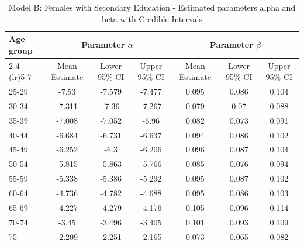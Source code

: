 \begin{landscape}
\begin{table}[htbp]
\centering
\caption{Model B: Females with Secondary Education - Estimated parameters alpha and beta  with Credible Intervals}
\label{tab:parameters_ab11}
\begin{tabular}{@{}lcccccc@{}}
\toprule
Age group & \multicolumn{3}{c}{Parameter \(\alpha\)} & \multicolumn{3}{c}{Parameter \(\beta\)} \\ 
\cmidrule(lr){2-4} \cmidrule(lr){5-7}
          & Mean Estimate & Lower 95\% CI & Upper 95\% CI & Mean Estimate & Lower 95\% CI & Upper 95\% CI \\ 
\midrule
25-29 & -7.53 & -7.579 & -7.477 & 0.095 & 0.086 & 0.104 \\
30-34 & -7.311 & -7.36 & -7.267 & 0.079 & 0.07 & 0.088 \\
35-39 & -7.008 & -7.052 & -6.96 & 0.082 & 0.073 & 0.091 \\
40-44 & -6.684 & -6.731 & -6.637 & 0.094 & 0.086 & 0.102 \\
45-49 & -6.252 & -6.3 & -6.206 & 0.096 & 0.087 & 0.104 \\
50-54 & -5.815 & -5.863 & -5.766 & 0.085 & 0.076 & 0.094 \\
55-59 & -5.338 & -5.386 & -5.292 & 0.095 & 0.087 & 0.102 \\
60-64 & -4.736 & -4.782 & -4.688 & 0.095 & 0.086 & 0.103 \\
65-69 & -4.227 & -4.279 & -4.176 & 0.105 & 0.096 & 0.114 \\
70-74 & -3.45 & -3.496 & -3.405 & 0.101 & 0.093 & 0.109 \\
75+ & -2.209 & -2.251 & -2.165 & 0.073 & 0.065 & 0.082 \\
\bottomrule
\end{tabular}
\end{table}
\end{landscape}